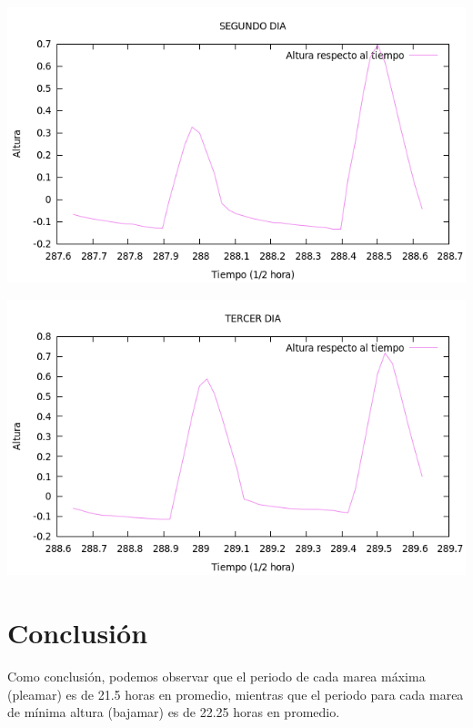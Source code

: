 \documentclass[12pt]{article}
\begin{document}
\begin{center}
	\includegraphics[width=14cm]{graf2d.png}\\
\end{center}	

\begin{center}
	\includegraphics[width=14cm]{graf3d.png}\\
\end{center}	

\section{Conclusión}

	Como conclusión, podemos observar que el periodo de cada marea máxima (pleamar) es de 21.5 horas en promedio, mientras que el periodo para cada marea de mínima altura (bajamar) es de 22.25 horas en promedio.
\end{document}
